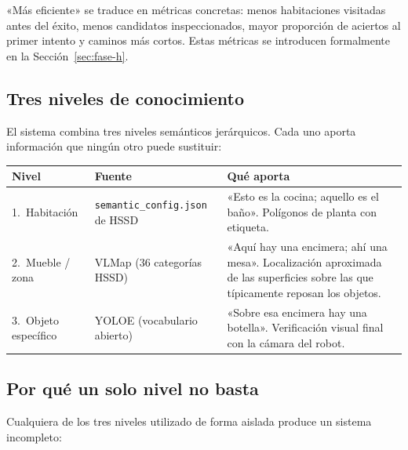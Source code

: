 \documentclass[11pt,a4paper]{article}
\begin{document}
«Más eficiente» se traduce en métricas concretas: menos habitaciones visitadas
antes del éxito, menos candidatos inspeccionados, mayor proporción de aciertos
al primer intento y caminos más cortos. Estas métricas se introducen formalmente
en la Sección~\ref{sec:fase-h}.

\subsection{Tres niveles de conocimiento}
\label{sec:tres-niveles}

El sistema combina tres niveles semánticos jerárquicos. Cada uno aporta
información que ningún otro puede sustituir:

\begin{center}
\begin{tabular}{p{2.8cm}p{4.5cm}p{6.5cm}}
\toprule
\textbf{Nivel} & \textbf{Fuente} & \textbf{Qué aporta} \\
\midrule
1.~Habitación &
  \texttt{semantic\_config.json} de HSSD &
  «Esto es la cocina; aquello es el baño». Polígonos de planta con etiqueta. \\
2.~Mueble / zona &
  VLMap (36 categorías HSSD) &
  «Aquí hay una encimera; ahí una mesa». Localización aproximada de las
  superficies sobre las que típicamente reposan los objetos. \\
3.~Objeto específico &
  YOLOE (vocabulario abierto) &
  «Sobre esa encimera hay una botella». Verificación visual final con la
  cámara del robot. \\
\bottomrule
\end{tabular}
\end{center}

\subsection{Por qué un solo nivel no basta}

Cualquiera de los tres niveles utilizado de forma aislada produce un sistema
incompleto:
\end{document}
